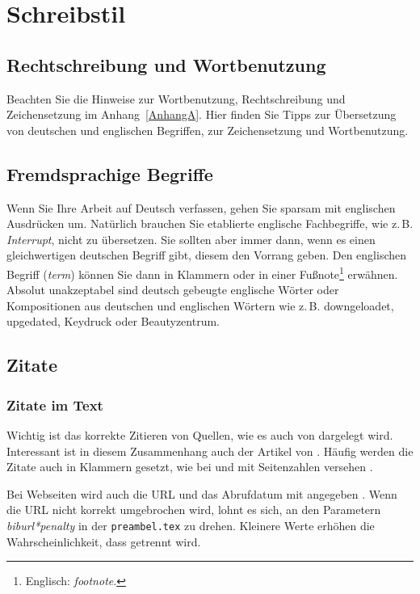 \chapter{Schreibstil}

\section{Rechtschreibung und Wortbenutzung}

Beachten Sie die Hinweise zur Wortbenutzung, Rechtschreibung und Zeichensetzung im Anhang~\ref{AnhangA}. Hier finden Sie Tipps zur Übersetzung von deutschen und englischen Begriffen, zur Zeichensetzung und Wortbenutzung.

\section{Fremdsprachige Begriffe}

Wenn Sie Ihre Arbeit auf Deutsch verfassen, gehen Sie sparsam mit englischen Ausdrücken um. Natürlich brauchen Sie etablierte englische Fachbegriffe, wie z.\,B. \textit{Interrupt}, nicht zu übersetzen. Sie sollten aber immer dann, wenn es einen gleichwertigen deutschen Begriff gibt, diesem den Vorrang geben. Den englischen Begriff (\textit{term}) können Sie dann in Klammern oder in einer Fußnote\footnote{Englisch: \textit{footnote}.} erwähnen. Absolut unakzeptabel sind deutsch gebeugte englische Wörter oder Kompositionen aus deutschen und englischen Wörtern wie z.\,B. downgeloadet, upgedated, Keydruck oder Beautyzentrum.

\section{Zitate}

\subsection{Zitate im Text}

Wichtig ist das korrekte Zitieren von Quellen, wie es auch von \cite{Kornmeier2011} dargelegt wird. Interessant ist in diesem Zusammenhang auch der Artikel von \cite{Kramer2009}. Häufig werden die Zitate auch in Klammern gesetzt, wie bei \parencite{Kornmeier2011} und mit Seitenzahlen versehen \parencite[S. 22--24]{Kornmeier2011}.

Bei Webseiten wird auch die URL und das Abrufdatum mit angegeben \parencite{Gao2017}. Wenn die URL nicht korrekt umgebrochen wird, lohnt es sich, an den Parametern \textit{biburl*penalty} in der \texttt{preambel.tex} zu drehen. Kleinere Werte erhöhen die Wahrscheinlichkeit, dass getrennt wird. 

